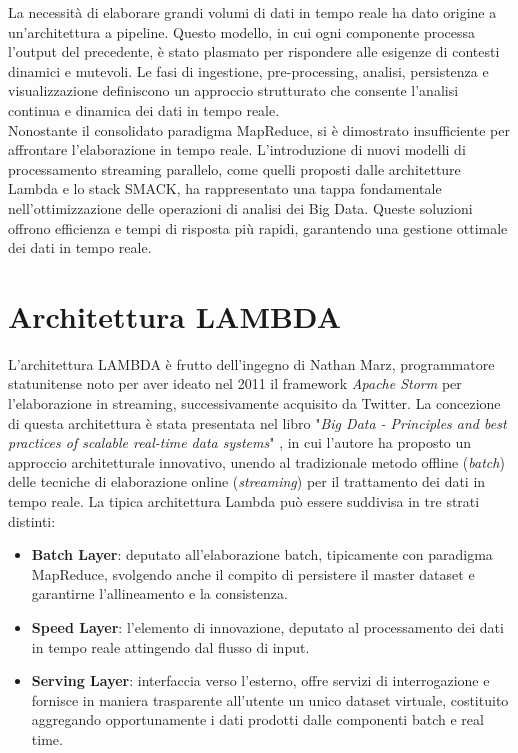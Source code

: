 La necessità di elaborare grandi volumi di dati in tempo reale ha dato origine a un'architettura a pipeline. 
Questo modello, in cui ogni componente processa l'output del precedente, è stato plasmato per rispondere alle esigenze di contesti dinamici e mutevoli. 
Le fasi di ingestione, pre-processing, analisi, persistenza e visualizzazione definiscono un approccio strutturato che consente l'analisi continua e dinamica dei dati in tempo reale. \\
Nonostante il consolidato paradigma MapReduce, si è dimostrato insufficiente per affrontare l'elaborazione in tempo reale. 
L'introduzione di nuovi modelli di processamento streaming parallelo, come quelli proposti dalle architetture Lambda e lo stack SMACK, ha rappresentato una tappa fondamentale nell'ottimizzazione delle operazioni di analisi dei Big Data. 
Queste soluzioni offrono efficienza e tempi di risposta più rapidi, garantendo una gestione ottimale dei dati in tempo reale.

\section[Architettura LAMBDA]{Architettura LAMBDA}
L'architettura LAMBDA è frutto dell'ingegno di Nathan Marz, programmatore statunitense noto per aver ideato nel 2011 il framework \textit{Apache Storm} per l'elaborazione in streaming, successivamente acquisito da Twitter.
La concezione di questa architettura è stata presentata nel libro "\textit{Big Data - Principles and best practices of scalable real-time data systems}" \cite{bigDataBook}, in cui l'autore ha proposto un approccio architetturale innovativo, unendo al tradizionale metodo offline (\textit{batch}) delle tecniche di elaborazione online (\textit{streaming}) per il trattamento dei dati in tempo reale.
La tipica architettura Lambda può essere suddivisa in tre strati distinti:
\begin{itemize}
    \item \textbf{Batch Layer}: deputato all'elaborazione batch, tipicamente con paradigma MapReduce, svolgendo anche il compito di persistere il master dataset e garantirne l'allineamento e la consistenza.
    \item \textbf{Speed Layer}: l'elemento di innovazione, deputato al processamento dei dati in tempo reale attingendo dal flusso di input.
    \item \textbf{Serving Layer}: interfaccia verso l'esterno, offre servizi di interrogazione e fornisce in maniera trasparente all'utente un unico dataset virtuale, costituito aggregando opportunamente i dati prodotti dalle componenti batch e real time.
\end{itemize}

